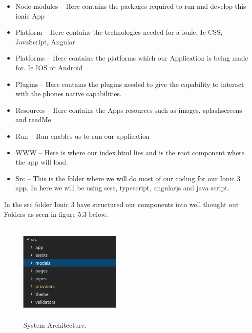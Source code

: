 \begin{itemize}
\item Node-modules – Here contains the packages required to run and develop this ionic App
\item Platform – Here contains the technologies needed for a ionic. Ie CSS, JavaScript, Angular
\item Platforms – Here contains the platforms which our Application is being made for. Ie IOS or Android
\item Plugins – Here contains the plugins needed to give the capability to interact with the phones native capabilities.
\item Resources – Here contains the Apps resources such as images, splashscreens and readMe
\item Run – Run enables us to run our application
\item WWW – Here is where our index.html lies and is the root component where the app will load. 
\item Src – This is the folder where we will do most of our coding for our Ionic 3 app. In here we will be using scss, typescript, angularjs and java script.
\end{itemize}

In the src folder Ionic 3 have structured our components into well thought out Folders as seen in figure 5.3 below.

\begin{figure}[h]
\centering
\includegraphics[width=5cm, height=5cm]{img/srcStructure}
\caption{System Architecture.}
\end{figure}

